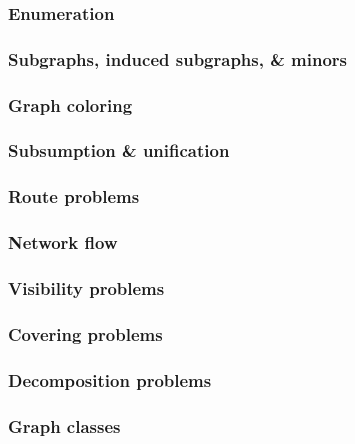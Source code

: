 \documentclass[oneside]{book}
\numberwithin{equation}{section}
\begin{document}
\subsubsection{Enumeration}

\subsubsection{Subgraphs, induced subgraphs, \& minors}

\subsubsection{Graph coloring}

\subsubsection{Subsumption \& unification}

\subsubsection{Route problems}

\subsubsection{Network flow}

\subsubsection{Visibility problems}

\subsubsection{Covering problems}

\subsubsection{Decomposition problems}

\subsubsection{Graph classes}




\printbibliography[heading=bibintoc]
	
\end{document}
